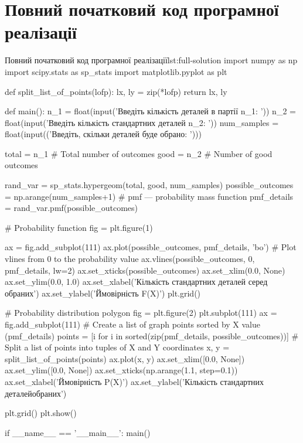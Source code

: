 \documentclass[
	a4paper,
	oneside,
	BCOR = 10mm,
	DIV = 12,
	12pt,
	headings = normal,
]{scrartcl}
\begin{document}
		\section{Повний початковий код програмної реалізації}
		\label{sec:full-listing}
			\begin{listingpython}[toprule = 0pt, bottomrule = 0pt]{Повний початковий код програмної реалізації}{lst:full-solution}
import numpy as np
import scipy.stats as sp_stats
import matplotlib.pyplot as plt


def split_list_of_points(lofp):
    lx, ly = zip(*lofp)
    return lx, ly


def main():
    n_1 = float(input('Введіть кількість деталей в партії n_1: '))
    n_2 = float(input('Введіть кількість стандартних деталей n_2: '))
    num_samples = float(input(('Введіть, скільки деталей буде обрано: ')))

    total = n_1  # Total number of outcomes
    good = n_2   # Number of good outcomes

    rand_var = sp_stats.hypergeom(total, good, num_samples)
    possible_outcomes = np.arange(num_samples+1)
    # pmf --- probability mass function
    pmf_details = rand_var.pmf(possible_outcomes)

    # Probability function
    fig = plt.figure(1)

    ax = fig.add_subplot(111)
    ax.plot(possible_outcomes, pmf_details, 'bo')
    # Plot vlines from 0 to the probability value
    ax.vlines(possible_outcomes, 0, pmf_details, lw=2)
    ax.set_xticks(possible_outcomes)
    ax.set_xlim(0.0, None)
    ax.set_ylim(0.0, 1.0)
    ax.set_xlabel('Кількість стандартних деталей серед обраних')
    ax.set_ylabel('Ймовірність F(X)')
    plt.grid()

    # Probability distribution polygon
    fig = plt.figure(2)
    plt.subplot(111)
    ax = fig.add_subplot(111)
    # Create a list of graph points sorted by X value (pmf_details)
    points = [i for i in sorted(zip(pmf_details, possible_outcomes))]
    # Split a list of points into tuples of X and Y coordinates
    x, y = split_list_of_points(points)
    ax.plot(x, y)
    ax.set_xlim([0.0, None])
    ax.set_ylim([0.0, None])
    ax.set_xticks(np.arange(1.1, step=0.1))
    ax.set_xlabel('Ймовірність P(X)')
    ax.set_ylabel('Кількість стандартних деталей обраних')

    plt.grid()
    plt.show()


if __name__ == '__main__':
    main()
			\end{listingpython}
\end{document}
